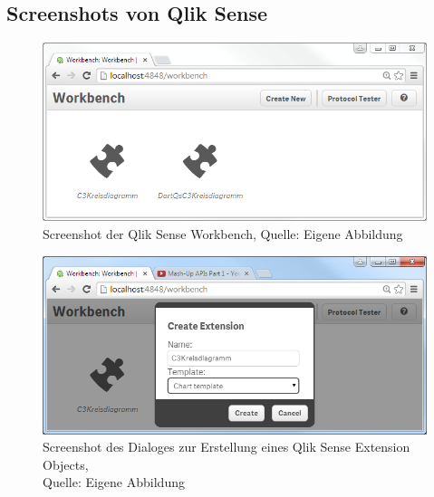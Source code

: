 \begin{appendix}
\newpage
\subsection{Screenshots von Qlik Sense} 
\label{lab:ScreenshotsVonQlikSense} 

\ifIncludeFigures\begin{figure}[htbp]
	\centering
		\includegraphics[width=1.00\textwidth]{img/SenseScreenshots/Workbench.PNG}
	\caption[Screenshot der Qlik Sense Workbench]{Screenshot der Qlik Sense Workbench, Quelle: Eigene Abbildung}
	\label{fig:Workbench}
\end{figure}\fi

\ifIncludeFigures\begin{figure}[htbp]
	\centering
		\includegraphics[width=1.00\textwidth]{img/SenseScreenshots/WorkbenchCreateNew.PNG}
	\caption[Screenshot des Dialoges zur Erstellung eines Qlik Sense Extension Objects]{Screenshot des Dialoges zur Erstellung eines Qlik Sense Extension Objects, \\Quelle: Eigene Abbildung}
	\label{fig:WorkbenchCreateNew}
\end{figure}\fi

\newpage


\end{appendix}
